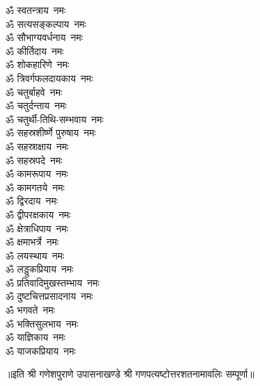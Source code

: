 \begin{multicols}{2}
\begin{flushleft}
ॐ स्वतन्त्राय~नमः\\
ॐ सत्यसङ्कल्पाय~नमः\\
ॐ सौभाग्यवर्धनाय~नमः\\
ॐ कीर्तिदाय~नमः\\
ॐ शोकहारिणे~नमः\\
ॐ त्रिवर्गफलदायकाय~नमः\\
ॐ चतुर्बाहवे~नमः\\
ॐ चतुर्दन्ताय~नमः\hfill{}\\
ॐ चतुर्थी-तिथि-सम्भवाय~नमः\\
ॐ सहस्रशीर्ष्णे पुरुषाय~नमः\\
ॐ सहस्राक्षाय~नमः\\
ॐ सहस्रपदे~नमः\\
ॐ कामरूपाय~नमः\\
ॐ कामगतये~नमः\\
ॐ द्विरदाय~नमः\\
ॐ द्वीपरक्षकाय~नमः\\
ॐ क्षेत्राधिपाय~नमः\\
ॐ क्षमाभर्त्रे~नमः\hfill{}\\
ॐ लयस्थाय~नमः\\
ॐ लड्डुकप्रियाय~नमः\\
ॐ प्रतिवादिमुखस्तम्भाय~नमः\\
ॐ दुष्टचित्तप्रसादनाय~नमः\\
ॐ भगवते~नमः\\
ॐ भक्तिसुलभाय~नमः\\
ॐ याज्ञिकाय~नमः\\
ॐ याजकप्रियाय~नमः\\
\end{flushleft}
\end{multicols}
॥इति श्री गणेशपुराणे उपासनाखण्डे श्री गणपत्यष्टोत्तरशतनामावलिः सम्पूर्णा॥
